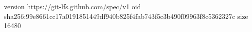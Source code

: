 version https://git-lfs.github.com/spec/v1
oid sha256:99e8661cc17a0191851449df940b825f4fab743f5c3b490f09963f8c5362327c
size 16480
